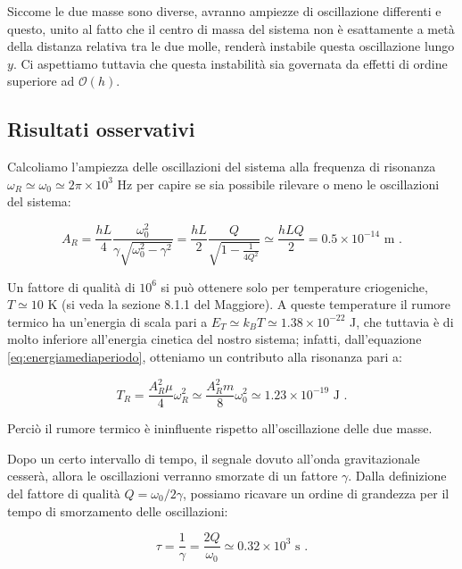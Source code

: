\documentclass[a4paper,10pt]{article}
\begin{document}
Siccome le due masse sono diverse, avranno ampiezze di oscillazione differenti e questo, unito al fatto che il centro di massa del sistema non è esattamente a metà della distanza relativa tra le due molle, renderà instabile questa oscillazione lungo $y$.
Ci aspettiamo tuttavia che questa instabilità sia governata da effetti di ordine superiore ad $\mathcal O(h)$.




\subsection{Risultati osservativi}

Calcoliamo l'ampiezza delle oscillazioni del sistema alla frequenza di risonanza $\omega_R \simeq \omega_0 \simeq 2\pi \times 10^3$ Hz per capire se sia possibile rilevare o meno le oscillazioni del sistema:

\begin{equation} \label{eq:risonanza}
    A_R = \frac{h L}{4} \frac{\omega_0^2}{\gamma \sqrt{\omega_0^2 - \gamma^2}} = \frac{h L}{2} \frac{Q}{\sqrt{1 - \frac{1}{4Q^2}}} \simeq \frac{h L Q}{2} = 0.5 \times 10^{-14} \text{ m .}
\end{equation}

Un fattore di qualità di $10^6$ si può ottenere solo per temperature criogeniche, $T \simeq 10$ K (si veda la sezione 8.1.1 del Maggiore). 
A queste temperature il rumore termico ha un'energia di scala pari a $E_T \simeq k_B T \simeq 1.38 \times 10^{-22}$ J, che tuttavia è di molto inferiore all'energia cinetica del nostro sistema; infatti, dall'equazione \eqref{eq:energiamediaperiodo}, otteniamo un contributo alla risonanza pari a:

\begin{equation} \label{eq:epotrisonanza}
    T_R = \frac{A_R^2 \mu}{4} \omega_R^2 \simeq \frac{A_R^2 m}{8} \omega_0^2 \simeq 1.23 \times 10^{-19} \text{ J .}
\end{equation}

Perciò il rumore termico è ininfluente rispetto all'oscillazione delle due masse. 

Dopo un certo intervallo di tempo, il segnale dovuto all'onda gravitazionale cesserà, allora le oscillazioni verranno smorzate di un fattore $\gamma$. 
Dalla definizione del fattore di qualità $Q = \omega_0/2\gamma$, possiamo ricavare un ordine di grandezza per il tempo di smorzamento delle oscillazioni:

\begin{equation} \label{eq:tau}
    \tau = \frac{1}{\gamma} = \frac{2 Q}{\omega_0} \simeq 0.32 \times 10^3 \text{ s .}
\end{equation}
\end{document}
